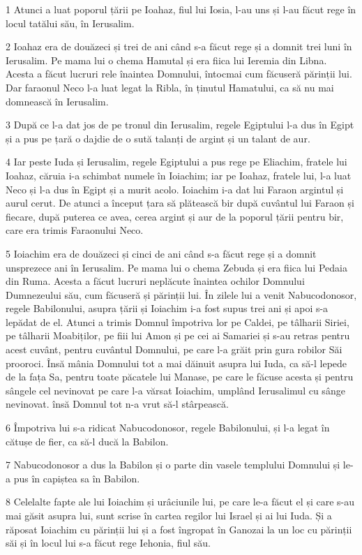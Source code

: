 \par 1 Atunci a luat poporul țării pe Ioahaz, fiul lui Iosia, l-au uns și l-au făcut rege în locul tatălui său, în Ierusalim.
\par 2 Ioahaz era de douăzeci și trei de ani când s-a făcut rege și a domnit trei luni în Ierusalim. Pe mama lui o chema Hamutal și era fiica lui Ieremia din Libna. Acesta a făcut lucruri rele înaintea Domnului, întocmai cum făcuseră părinții lui. Dar faraonul Neco l-a luat legat la Ribla, în ținutul Hamatului, ca să nu mai domnească în Ierusalim.
\par 3 După ce l-a dat jos de pe tronul din Ierusalim, regele Egiptului l-a dus în Egipt și a pus pe țară o dajdie de o sută talanți de argint și un talant de aur.
\par 4 Iar peste Iuda și Ierusalim, regele Egiptului a pus rege pe Eliachim, fratele lui Ioahaz, căruia i-a schimbat numele în Ioiachim; iar pe Ioahaz, fratele lui, l-a luat Neco și l-a dus în Egipt și a murit acolo. Ioiachim i-a dat lui Faraon argintul și aurul cerut. De atunci a început țara să plătească bir după cuvântul lui Faraon și fiecare, după puterea ce avea, cerea argint și aur de la poporul țării pentru bir, care era trimis Faraonului Neco.
\par 5 Ioiachim era de douăzeci și cinci de ani când s-a făcut rege și a domnit unsprezece ani în Ierusalim. Pe mama lui o chema Zebuda și era fiica lui Pedaia din Ruma. Acesta a făcut lucruri neplăcute înaintea ochilor Domnului Dumnezeului său, cum făcuseră și părinții lui. În zilele lui a venit Nabucodonosor, regele Babilonului, asupra țării și Ioiachim i-a fost supus trei ani și apoi s-a lepădat de el. Atunci a trimis Domnul împotriva lor pe Caldei, pe tâlharii Siriei, pe tâlharii Moabiților, pe fiii lui Amon și pe cei ai Samariei și s-au retras pentru acest cuvânt, pentru cuvântul Domnului, pe care l-a grăit prin gura robilor Săi prooroci. Însă mânia Domnului tot a mai dăinuit asupra lui Iuda, ca să-l lepede de la fața Sa, pentru toate păcatele lui Manase, pe care le făcuse acesta și pentru sângele cel nevinovat pe care l-a vărsat Ioiachim, umplând Ierusalimul cu sânge nevinovat. însă Domnul tot n-a vrut să-l stârpească.
\par 6 Împotriva lui s-a ridicat Nabucodonosor, regele Babilonului, și l-a legat în cătușe de fier, ca să-l ducă la Babilon.
\par 7 Nabucodonosor a dus la Babilon și o parte din vasele templului Domnului și le-a pus în capiștea sa în Babilon.
\par 8 Celelalte fapte ale lui Ioiachim și urâciunile lui, pe care le-a făcut el și care s-au mai găsit asupra lui, sunt scrise în cartea regilor lui Israel și ai lui Iuda. Și a răposat Ioiachim cu părinții lui și a fost îngropat în Ganozai la un loc cu părinții săi și în locul lui s-a făcut rege Iehonia, fiul său.

